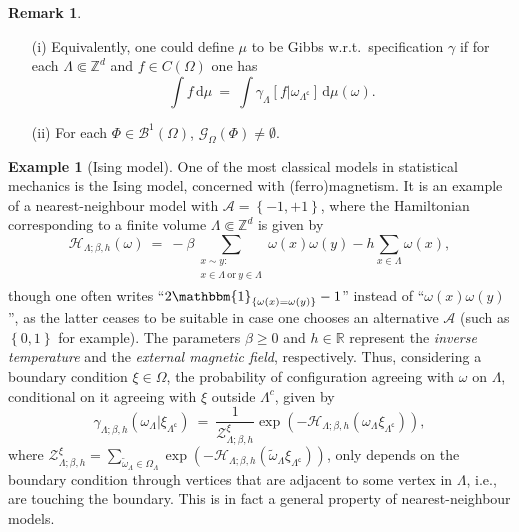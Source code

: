 \documentclass[12pt]{article}
\newcommand{\A}{\mathcal{A}}
\newcommand{\BB}{\mathscr{B}}
\renewcommand{\d}{\mathrm{d}}
\newcommand{\G}{\mathcal{G}}
\renewcommand{\H}{\mathcal{H}}
\newcommand{\R}{\mathbb{R}}
\newcommand{\Z}{\mathbb{Z}}
\newcommand{\ZZ}{\mathcal{Z}}
\newcommand{\set}[1]{\left\{#1\right\}}
\newcommand{\1}{\mathbbm{1}}
\renewcommand{\c}{\mathsf{c}}
\newcommand{\5}{\vspace{0.5cm}}
\renewcommand{\tilde}{\widetilde}
\theoremstyle{definition}
\newtheorem{ex}[thm]{Example}
\newtheorem{rem}[thm]{Remark}
\begin{document}
\begin{rem}\label{Rem:DLR}
~
\begin{itemize}
	\item[(i)] Equivalently, one could define $\mu$ to be Gibbs w.r.t.~specification $\gamma$ if for each $\Lambda\Subset\Z^d$ and $f\in C(\Omega)$ one has
	$$\int f\,\d\mu ~=~ \int\gamma_\Lambda[f|\omega_{\Lambda^\c}]\,\d\mu(\omega).$$
	\item[(ii)] For each $\Phi\in\BB^1(\Omega)$, $\G_\Omega(\Phi)\neq\emptyset$.
\end{itemize}
\end{rem}

\begin{ex}[Ising model]
One of the most classical models in statistical mechanics is the Ising model, concerned with (ferro)magnetism. It is an example of a nearest-neighbour model with $\A=\set{-1,+1}$, where the Hamiltonian corresponding to a finite volume $\Lambda\Subset\Z^d$ is given by
$$\H_{\Lambda;\beta,h}(\omega) ~=~ -\beta\!\!\!\!\!\!\!\sum_{\substack{x\sim y:\\x\in\Lambda~\text{or}~y\in\Lambda\\}}\!\!\!\!\!\!\!\omega(x)\omega(y) - h\sum_{x\in\Lambda}\omega(x),$$
though one often writes ``$2\1_{\set{\omega(x)=\omega(y)}}-1$'' instead of ``$\omega(x)\omega(y)$'', as the latter ceases to be suitable in case one chooses an alternative $\A$ (such as $\set{0,1}$ for example). The parameters $\beta\geq 0$ and $h\in\R$ represent the \textit{inverse temperature} and the \textit{external magnetic field}, respectively. Thus, considering a boundary condition $\xi\in\Omega$, the probability of configuration agreeing with $\omega$ on $\Lambda$, conditional on it agreeing with $\xi$ outside $\Lambda^c$, given by
$$\gamma_{\Lambda;\beta,h}(\omega_\Lambda|\xi_{\Lambda^\c}) ~=~ \frac{1}{\ZZ_{\Lambda;\beta,h}^\xi}\exp(-\H_{\Lambda;\beta,h}(\omega_\Lambda\xi_{\Lambda^\c})),$$
where $\ZZ_{\Lambda;\beta,h}^\xi=\sum_{\tilde{\omega}_\Lambda\in\Omega_\Lambda}\exp(-\H_{\Lambda;\beta,h}(\tilde{\omega}_\Lambda\xi_{\Lambda^\c}))$, only depends on the boundary condition through vertices that are adjacent to some vertex in $\Lambda$, i.e., are touching the boundary. This is in fact a general property of nearest-neighbour models.
\end{ex}
\end{document}
